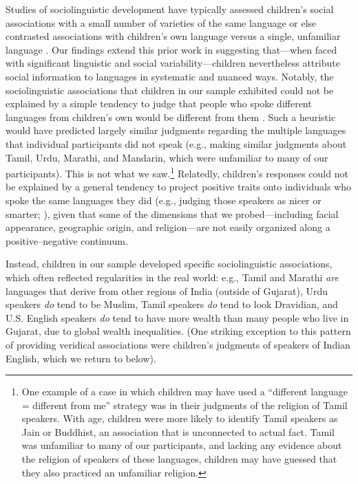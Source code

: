 \documentclass{foushee-adapted-preprint}
\begin{document}
Studies of sociolinguistic development have typically assessed children's social associations with a small number of varieties of the same language \parencite[e.g.,][]{weatherhead2019preschoolers, mccullough2019regional,kinzler2013northern} or else contrasted associations with children's own language versus a single, unfamiliar language \parencite[e.g.,][]{liberman2017preverbal, hirschfeld1997young, kinzler2012children, kinzler2007native, moon1993two}. Our findings extend this prior work in suggesting that---when faced with significant linguistic and social variability---children nevertheless attribute social information to languages in systematic and nuanced ways. 
Notably, the sociolinguistic associations that children in our sample exhibited could not be explained by a simple tendency to judge that people who spoke different languages from children's own would be different from them \parencite{hirschfeld1997young}. 
Such a heuristic would have predicted largely similar judgments regarding the multiple languages that individual participants did not speak (e.g., making similar judgments about Tamil, Urdu, Marathi, and Mandarin, which were unfamiliar to many of our participants). 
This is not what we saw.\footnote{One example of a case in which children may have used a ``different language = different from me'' strategy was in their judgments of the religion of Tamil speakers. With age, children were more likely to identify Tamil speakers as Jain or Buddhist, an association that is unconnected to actual fact. Tamil was unfamiliar to many of our participants, and lacking any evidence about the religion of speakers of these languages, children may have guessed that they also practiced an unfamiliar religion.} 
Relatedly, children's responses could not be explained by a general tendency to project positive traits onto individuals who spoke the same languages they did (e.g., judging those speakers as nicer or smarter; \cite{santhanagopalan2021nationality}), given that some of the dimensions that we probed---including facial appearance, geographic origin, and religion---are not easily organized along a positive--negative continuum.

Instead, children in our sample developed specific sociolinguistic associations, which often reflected regularities in the real world: e.g., Tamil and Marathi \textit{are} languages that derive from other regions of India (outside of Gujarat), Urdu speakers \textit{do} tend to be Muslim, Tamil speakers \textit{do} tend to look Dravidian, and U.S. English speakers \textit{do} tend to have more wealth than many people who live in Gujarat, due to global wealth inequalities. 
(One striking exception to this pattern of providing veridical associations were children's judgments of speakers of Indian English, which we return to below). 
\end{document}
